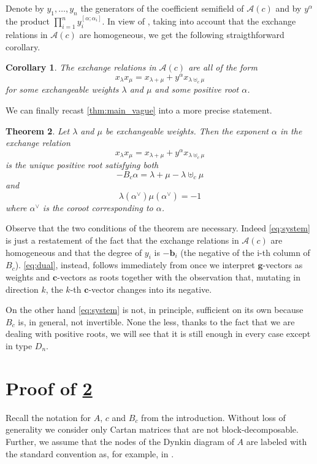\documentclass[11pt]{amsart}
\newcommand{\saySS}[1]{\say[SS]{#1}}
\newcommand{\cA}{\mathcal{A}}
\newcommand{\bg}{\mathbf{g}}
\newcommand{\bc}{\mathbf{c}}
\newcommand{\bb}{\mathbf{b}}
\newtheorem{theorem}{Theorem}[section]
\newtheorem{corollary}[theorem]{Corollary}
\numberwithin{equation}{section}
\begin{document}
  Denote by $y_1,\dots,y_n$ the generators of the coefficient semifield of $\cA(c)$ and by $y^\alpha$ the product $\prod_{i=1}^n y_i^{[\alpha;\alpha_i]}$.
  In view of \cite{NS14}, taking into account that the exchange relations in $\cA(c)$ are homogeneous, we get the following straigthforward corollary.
  \begin{corollary}
    The exchange relations in $\cA(c)$ are all of the form 
    \[
      x_\lambda x_\mu = x_{\lambda+\mu} + y^\alpha x_{\lambda\uplus_c\mu}
    \]
    for some exchangeable weights $\lambda$ and $\mu$ and some positive root $\alpha$.
  \end{corollary}

  We can finally recast \cref{thm:main_vague} into a more precise statement.
  \begin{theorem}
    \label{thm:main}
    Let $\lambda$ and $\mu$ be exchangeable weights. 
    Then the exponent $\alpha$ in the exchange relation
    \[
      x_\lambda x_\mu = x_{\lambda+\mu} + y^\alpha x_{\lambda\uplus_c\mu}
    \]
    is the unique positive root satisfying both
    \saySS{Check signs here}
    \begin{equation}
      \label{eq:system}
      -B_c\alpha = \lambda+\mu-\lambda\uplus_c\mu
    \end{equation}
    and
    \begin{equation}
      \label{eq:dual}
      \lambda(\alpha^\vee) \mu(\alpha^\vee) = -1
    \end{equation}
    where $\alpha^\vee$ is the \emph{coroot} corresponding to $\alpha$.
  \end{theorem}
  Observe that the two conditions of the theorem are necessary. 
  Indeed \cref{eq:system} is just a restatement of the fact that the exchange relations in $\cA(c)$ are homogeneous and that the degree of $y_i$ is $-\bb_i$ (the negative of the i-th column of $B_c$).
  \cref{eq:dual}, instead, follows immediately from \cite[Eq. (1.11)]{NZ11} once we interpret $\bg$-vectors as weights and $\bc$-vectors as roots together with the observation that, mutating in direction $k$, the $k$-th $\bc$-vector changes into its negative.
  
  On the other hand \cref{eq:system} is not, in principle, sufficient on its own because $B_c$ is, in general, not invertible.
  None the less, thanks to the fact that we are dealing with positive roots, we will see that it is still enough in every case except in type $D_n$.
  
  
\section{Proof of \cref{thm:main}}
  Recall the notation for $A$, $c$ and $B_c$ from the introduction. 
  Without loss of generality we consider only Cartan matrices that are not block-decomposable.
  Further, we assume that the nodes of the Dynkin diagram of $A$ are labeled with the standard convention as, for example, in \cite[Table Fin]{Kac90}.
\end{document}
